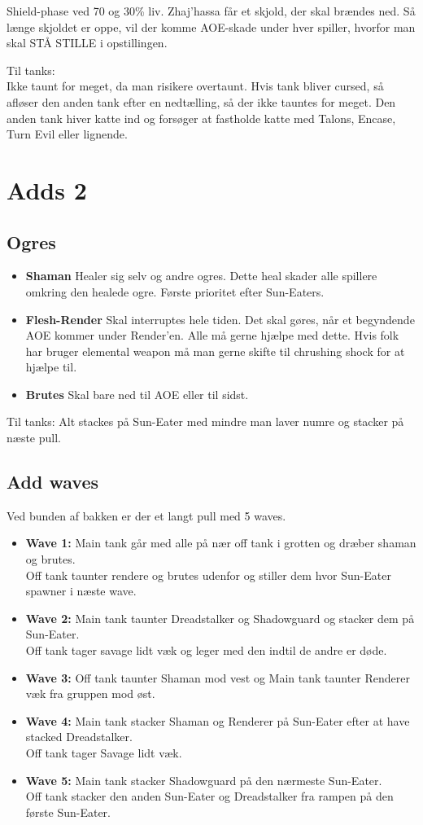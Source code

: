 \documentclass[12pt,a4paper]{article}
\begin{document}
Shield-phase ved 70 og 30\% liv. Zhaj'hassa får et skjold, der skal brændes
ned. Så længe skjoldet er oppe, vil der komme AOE-skade under hver spiller,
hvorfor man skal STÅ STILLE i opstillingen.

Til tanks:\\
Ikke taunt for meget, da man risikere overtaunt. Hvis tank bliver cursed, så
afløser den anden tank efter en nedtælling, så der ikke tauntes for meget.
Den anden tank hiver katte ind og forsøger at fastholde katte med Talons,
Encase, Turn Evil eller lignende.

\section*{Adds 2}
\subsection*{Ogres}
\begin{itemize}
	\item \textbf{Shaman} Healer sig selv og andre ogres. Dette heal skader
		alle spillere omkring den healede ogre. Første prioritet efter
		Sun-Eaters.
  \item \textbf{Flesh-Render} Skal interruptes hele tiden. Det skal gøres, når
    et begyndende AOE kommer under Render'en. Alle må gerne
		hjælpe med dette. Hvis folk har bruger elemental weapon må man
		gerne skifte til chrushing shock for at hjælpe til.
	\item \textbf{Brutes} Skal bare ned til AOE eller til sidst.
\end{itemize}
Til tanks: Alt stackes på Sun-Eater med mindre man laver numre og stacker på
næste pull. 

\subsection*{Add waves}
Ved bunden af bakken er der et langt pull med 5 waves. 
\begin{itemize}
	\item \textbf{Wave 1:} Main tank går med alle på nær off tank i grotten
		og dræber shaman og brutes. \\
		Off tank taunter rendere og brutes udenfor og stiller dem hvor
		Sun-Eater spawner i næste wave.
	\item \textbf{Wave 2:} Main tank taunter Dreadstalker og Shadowguard og
		stacker dem på Sun-Eater.\\
		Off tank tager savage lidt væk og leger med den indtil de andre
		er døde.
	\item \textbf{Wave 3:} Off tank taunter Shaman mod vest og Main tank taunter
		Renderer væk fra gruppen mod øst.
	\item \textbf{Wave 4:} Main tank stacker Shaman og Renderer på Sun-Eater
    efter at have stacked Dreadstalker.\\
    Off tank tager Savage lidt væk.
  \item \textbf{Wave 5:} Main tank stacker Shadowguard på den nærmeste
    Sun-Eater.\\
    Off tank stacker den anden Sun-Eater og Dreadstalker fra rampen på den første
    Sun-Eater.
\end{itemize}
\end{document}
